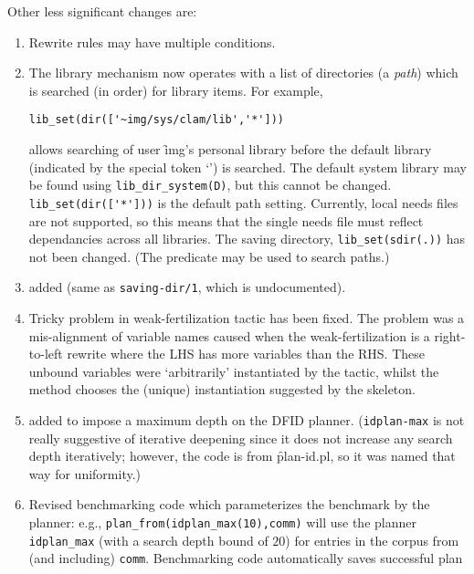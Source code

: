 Other less significant changes are:
\begin{enumerate}
\item Rewrite rules may have multiple conditions.  
\item The library mechanism now operates with a list of directories (a
          {\em path\/}) which is searched (in order) for library
          items.  For example,  
        \begin{center}
          \verb|lib_set(dir(['~img/sys/clam/lib','*']))|
        \end{center}
 allows
          searching of user \f{img}'s personal \clam{} library
          before the default library (indicated by the special token
          `{\tt *}') is searched.  The default system library may be
          found using \verb|lib_dir_system(D)|, but this cannot be
          changed.  \verb|lib_set(dir(['*']))| is the default path
          setting.  Currently, local needs files are not supported, so
          this means that the single needs file must reflect
          dependancies across all libraries.  The saving directory,
          \verb|lib_set(sdir(.))| has not been changed.  (The
          predicate  may be used to search
          paths.)
\item  {} added (same as {\tt saving-dir/1}, which is undocumented).
\item Tricky problem in weak-fertilization tactic has been fixed.
          The problem was a mis-alignment of variable names caused
          when the weak-fertilization is a right-to-left rewrite where
          the LHS has more variables than the RHS.  These unbound
          variables were `arbitrarily' instantiated by the tactic,
          whilst the method chooses the (unique) instantiation
          suggested by the skeleton.
\item {} added to impose a maximum depth on the DFID
          planner.  ({\tt idplan-max} is not really suggestive of iterative
          deepening since it does not increase any search depth
          iteratively; however, the code is from \f{plan-id.pl}, so it was
          named that way for uniformity.)  
\item Revised benchmarking code which parameterizes the benchmark
          by the planner: e.g., \verb|plan_from(idplan_max(10),comm)| will use
          the planner \verb|idplan_max| (with a search depth bound of $20$) for
          entries in the corpus from (and including) {\tt comm}.
          Benchmarking code automatically saves successful plan

\end{enumerate}
